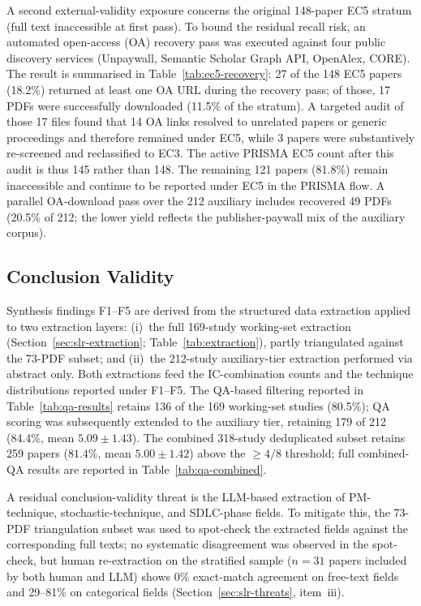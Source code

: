 A second external-validity exposure concerns the original 148-paper EC5
stratum (full text inaccessible at first pass). To bound the residual recall
risk, an
automated open-access (OA) recovery pass was executed against four public
discovery services (Unpaywall, Semantic Scholar Graph API, OpenAlex, CORE).
The result is summarised in Table~\ref{tab:ec5-recovery}: 27 of the 148 EC5
papers (18.2\%) returned at least one OA URL during the recovery pass; of
those, 17 PDFs were successfully downloaded (11.5\% of the stratum).
A targeted audit of those 17 files found that 14 OA links resolved to
unrelated papers or generic proceedings and therefore remained under EC5,
while 3 papers were substantively re-screened and reclassified to EC3.
The active PRISMA EC5 count after this audit is thus 145 rather than 148.
The remaining 121 papers (81.8\%) remain inaccessible and continue to be
reported under EC5 in the PRISMA flow. A parallel OA-download pass over the
212 auxiliary includes recovered 49 PDFs (20.5\% of 212; the lower yield
reflects the publisher-paywall mix of the auxiliary corpus).



\subsection{Conclusion Validity}

Synthesis findings F1--F5 are derived from the structured data extraction
applied to two extraction layers: (i)~the full 169-study working-set
extraction (Section~\ref{sec:slr-extraction};
Table~\ref{tab:extraction}), partly triangulated against the 73-PDF subset;
and (ii)~the 212-study auxiliary-tier extraction performed via abstract
only. Both extractions feed
the IC-combination counts and the technique distributions reported under
F1--F5. The QA-based filtering reported in Table~\ref{tab:qa-results}
retains 136 of the 169 working-set studies (80.5\%); QA scoring was
subsequently extended to the auxiliary tier,
retaining 179 of 212 (84.4\%, mean
$5.09 \pm 1.43$). The combined 318-study deduplicated subset retains 259 papers
($81.4\%$, mean $5.00 \pm 1.42$) above the $\geq 4/8$ threshold; full
combined-QA results are reported in Table~\ref{tab:qa-combined}.



A residual conclusion-validity threat is the LLM-based extraction of
PM-technique, stochastic-technique, and SDLC-phase fields. To mitigate this,
the 73-PDF triangulation subset was used to spot-check the extracted fields
against the corresponding full texts; no systematic disagreement was
observed in the spot-check, but human re-extraction on the stratified sample
($n=31$ papers included by both human and LLM) shows 0\% exact-match
agreement on free-text fields and 29--81\% on categorical fields
(Section~\ref{sec:slr-threats}, item~iii).


